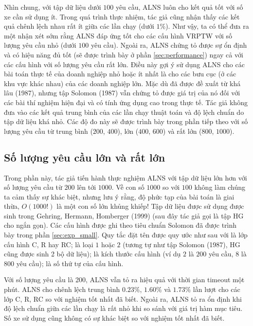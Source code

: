   Nhìn chung, với tập dữ liệu dưới $100$ yêu cầu, ALNS luôn cho kết quả tốt với số xe cần sử dụng ít. Trong quá trình thực nhiệm, tác giả cũng nhận thấy các kết quả chênh lệch nhau rất ít giữa các lần chạy (dưới $1\%$). Như vậy, ta có thể đưa ra một nhận xét sớm rằng ALNS đáp ứng tốt cho các cấu hình VRPTW với số lượng yêu cầu nhỏ (dưới $100$ yêu cầu). Ngoài ra, ALNS chứng tỏ được sự ổn định và có hiệu năng đủ tốt (sẽ được trình bày ở phần \ref{sec:performance}) ngay cả với các cấu hình với số lượng yêu cầu rất lớn. Điều này gợi ý sử dụng ALNS cho các bài toán thực tế của doanh nghiệp nhỏ hoặc ít nhất là cho các bưu cục (ở các khu vực khác nhau) của các doanh nghiệp lớn. Mặc dù đã được đề xuất từ khá lâu (1987), nhưng tập Solomon (1987) vẫn chứng tỏ được giá trị của nó đối với các bài thí nghiệm hiện đại và có tính ứng dụng cao trong thực tế. Tác giả không đưa vào các kết quả trung bình của các lần chạy thuật toán và độ lệch chuẩn do tập dữ liệu khá nhỏ. Các độ đo này sẽ được trình bày trong phần tiếp theo với số lượng yêu cầu từ trung bình ($200$, $400$), lớn ($400$, $600$) và rất lớn ($800$, $1000$).

  \subsection{Số lượng yêu cầu lớn và rất lớn}
  \label{sec:exp_large}
  
  Trong phần này, tác giả tiến hành thực nghiệm ALNS với tập dữ liệu lớn hơn với số lượng yêu cầu từ $200$ lên tới $1000$. Về con số $1000$ so với $100$ không làm chúng ta cảm thấy sự khác biệt, nhưng lưu ý rằng, độ phức tạp của bài toán là giai thừa, $O(1000!)$ là một con số lớn khủng khiếp! Tập dữ liệu được sử dụng được sinh trong Gehring, Hermann, Homberger (1999) \cite{gehring1999parallel} (sau đây tác giả gọi là tập HG cho ngắn gọn). Các cấu hình được ghi theo tiêu chuẩn Solomon đã được trình bày trong phần \ref{sec:exp_small}. Quy tắc đặt tên được quy ước như sau  với  là lớp cấu hình C, R hay RC;  là loại $1$ hoặc $2$ (tương tự như tập Solomon (1987), HG cũng được sinh 2 bộ dữ liệu);  là kích thước cấu hình (ví dụ $2$ là $200$ yêu cầu, $8$ là $800$ yêu cầu);  là số thứ tự của cấu hình.

  Với số lượng yêu cầu là 200, ALNS vẫn tỏ ra hiệu quả với thời gian timeout một phút. ALNS cho chênh lệch trung bình $0.23\%$, $1.60\%$ và $1.73\%$ lần lượt cho các lớp C, R, RC so với nghiệm tốt nhất đã biết. Ngoài ra, ALNS tỏ ra ổn định khi độ lệch chuẩn giữa các lần chạy là rất nhỏ khi so sánh với giá trị hàm mục tiêu. Số xe sử dụng cũng không có sự khác biệt so với nghiệm tốt nhất đã biết.

